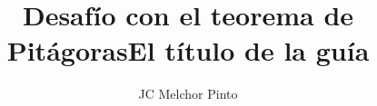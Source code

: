 \documentclass[12pt,addpoints,answers]{guia}
\title{Desafío con el teorema de Pitágoras}
\title{El título de la guía}
\author{JC Melchor Pinto}
\begin{document}
\pagestyle{headandfoot}

\INFO
\printanswers

\newpage
\begin{questions}
    \questionboxed[10] 
    \questionboxed[10] 
    \questionboxed[10] 
    \questionboxed[10] 
    \questionboxed[10] 
    \questionboxed[10] 
    \questionboxed[10] 
    \questionboxed[10] 
    \questionboxed[10] 
\end{questions}
\end{document}
